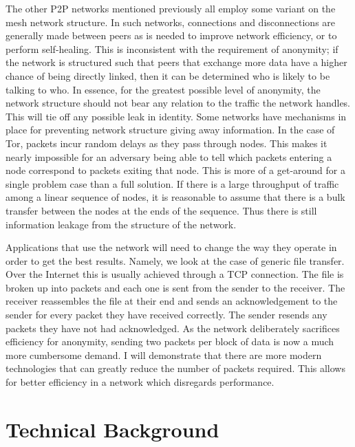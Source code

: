 \documentclass[ %
                    author={Luke Murray},
                supervisor={Dr. Simon Hollis},
                     title={Shadow Peer-to-Peer Networks},
                  subtitle={},
                    degree={MEng},
                      year={2013} ]{thesis}
\begin{document}
The other P2P networks mentioned previously all employ some variant on the mesh network structure. In such networks, connections and disconnections are generally made between peers as is needed to improve network efficiency, or to perform self-healing. This is inconsistent with the requirement of anonymity; if the network is structured such that peers that exchange more data have a higher chance of being directly linked, then it can be determined who is likely to be talking to who. In essence, for the greatest possible level of anonymity, the network structure should not bear any relation to the traffic the network handles. This will tie off any possible leak in identity. Some networks have mechanisms in place for preventing network structure giving away information. In the case of Tor, packets incur random delays as they pass through nodes. This makes it nearly impossible for an adversary being able to tell which packets entering a node correspond to packets exiting that node. This is more of a get-around for a single problem case than a full solution. If there is a large throughput of traffic among a linear sequence of nodes, it is reasonable to assume that there is a bulk transfer between the nodes at the ends of the sequence. Thus there is still information leakage from the structure of the network.

Applications that use the network will need to change the way they operate in order to get the best results. Namely, we look at the case of generic file transfer. Over the Internet this is usually achieved through a TCP connection. The file is broken up into packets and each one is sent from the sender to the receiver. The receiver reassembles the file at their end and sends an acknowledgement to the sender for every packet they have received correctly. The sender resends any packets they have not had acknowledged. As the network deliberately sacrifices efficiency for anonymity, sending two packets per block of data is now a much more cumbersome demand. I will demonstrate that there are more modern technologies that can greatly reduce the number of packets required. This allows for better efficiency in a network which disregards performance.


\chapter{Technical Background}
\label{chap:technical}
\end{document}
